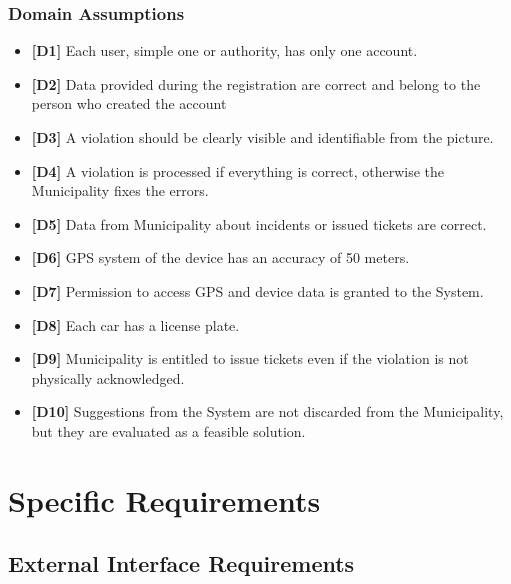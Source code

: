 \documentclass {article}
\begin{document}
		\subsubsection{Domain Assumptions}
		\begin{itemize}
		 \item {\bf [D1]} Each user, simple one or authority, has only one account.
		 \item {\bf [D2]} Data provided during the registration are correct and belong to the person who created the account
		 \item {\bf [D3]} A violation should be clearly visible and identifiable from the picture.
		 \item {\bf [D4]} A violation is processed if everything is correct, otherwise the Municipality fixes the errors.
		 \item {\bf [D5]} Data from Municipality about incidents or issued tickets are correct.
		 \item {\bf [D6]} GPS system of the device has an accuracy of 50 meters.
		 \item {\bf [D7]} Permission to access GPS and device data is granted to the System.
		 \item {\bf [D8]} Each car has a license plate.
		 \item {\bf [D9]} Municipality is entitled to issue tickets even if the violation is not physically acknowledged.
		 \item {\bf [D10]} Suggestions from the System are not discarded from the Municipality, but they are evaluated as a feasible solution.
		 \end{itemize}
		
\pagebreak

\section{Specific Requirements}
	\subsection{External Interface Requirements}	
\end{document}
